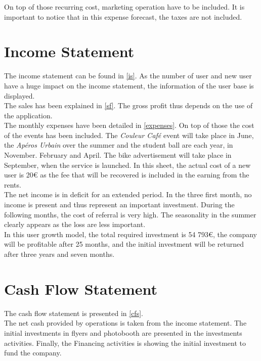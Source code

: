 \documentclass[12pt,a4paper,oneside]{book}
\begin{document}
On top of those recurring cost, marketing operation have to be included. It is important to notice that in this expense forecast, the taxes are not included.

\section{Income Statement}

The income statement can be found in \autoref{is}. As the number of user and new user have a huge impact on the income statement, the information of the user base is displayed.\\

The sales has been explained in \autoref{sf}. The gross profit thus depends on the use of the application.\\

The monthly expenses have been detailed in \autoref{expenses}. On top of those the cost of the events has been included. The \textit{Couleur Café} event will take place in June, the \textit{Apéros Urbain} over the summer and the student ball are each year, in November. February and April. The bike advertisement will take place in September, when the service is launched. In this sheet, the actual cost of a new user is 20\euro{} as the fee that will be recovered is included in the earning from the rents.\\

The net income is in deficit for an extended period. In the three first month, no income is present and thus represent an important investment. During the following months, the cost of referral is very high. The seasonality in the summer clearly appears as the loss are less important.\\

In this user growth model, the total required investment is 54 793\euro{}, the company will be profitable after 25 months, and the initial investment will be returned after three years and seven months.

\section{Cash Flow Statement}
The cash flow statement is presented in \autoref{cfs}.\\

The net cash provided by operations is taken from the income statement. The initial investments in flyers and photobooth are presented in the investments activities. Finally, the Financing activities is showing the initial investment to fund the company.\\
\end{document}
